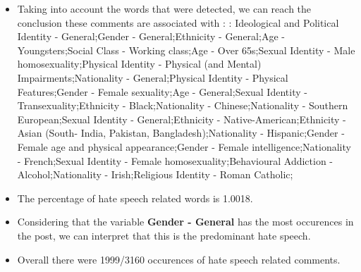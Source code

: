 \documentclass[11pt]{article}
\begin{document}
\begin{itemize}\item Taking into account the words that were detected, we can reach the conclusion these comments are associated with : :  Ideological and Political Identity - General;Gender - General;Ethnicity - General;Age - Youngsters;Social Class - Working class;Age - Over 65s;Sexual Identity - Male homosexuality;Physical Identity - Physical (and Mental) Impairments;Nationality - General;Physical Identity - Physical Features;Gender - Female sexuality;Age - General;Sexual Identity - Transexuality;Ethnicity - Black;Nationality - Chinese;Nationality - Southern European;Sexual Identity - General;Ethnicity - Native-American;Ethnicity - Asian (South- India, Pakistan, Bangladesh);Nationality - Hispanic;Gender - Female age and physical appearance;Gender - Female intelligence;Nationality - French;Sexual Identity - Female homosexuality;Behavioural Addiction - Alcohol;Nationality - Irish;Religious Identity - Roman Catholic;%

\item The percentage of hate speech related words is 1.0018.

\item Considering that the variable \textbf{Gender - General} has the most occurences in the post, we can interpret that this is the predominant hate speech.

\item Overall there were 1999/3160 occurences of hate speech related comments.\end{itemize}
\end{document}
